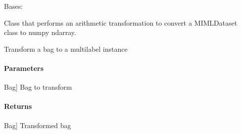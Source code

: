 \documentclass[letterpaper,10pt,english]{sphinxmanual}
\begin{document}
\begin{fulllineitems}
\label{\detokenize{transformation/mimlTOml/_autosummary/miml.transformation.mimlTOml.arithmetic.ArithmeticTransformation:miml.transformation.mimlTOml.arithmetic.ArithmeticTransformation}}
\pysigstartsignatures
{}
\pysigstopsignatures
\sphinxAtStartPar
Bases: {\hyperref[\detokenize{transformation/mimlTOml/_autosummary/miml.transformation.mimlTOml.miml_to_ml_transformation.MIMLtoMLTransformation:miml.transformation.mimlTOml.miml_to_ml_transformation.MIMLtoMLTransformation}]{}}

\sphinxAtStartPar
Class that performs an arithmetic transformation to convert a MIMLDataset class to numpy ndarray.

\begin{fulllineitems}
\label{\detokenize{transformation/mimlTOml/_autosummary/miml.transformation.mimlTOml.arithmetic.ArithmeticTransformation:miml.transformation.mimlTOml.arithmetic.ArithmeticTransformation.transform_bag}}
\pysigstartsignatures
{}
\pysigstopsignatures
\sphinxAtStartPar
Transform a bag to a multilabel instance


\paragraph{Parameters}
\label{\detokenize{transformation/mimlTOml/_autosummary/miml.transformation.mimlTOml.arithmetic.ArithmeticTransformation:parameters}}\begin{description}
\sphinxlineitem{bag}{[}Bag{]}
\sphinxAtStartPar
Bag to transform

\end{description}


\paragraph{Returns}
\label{\detokenize{transformation/mimlTOml/_autosummary/miml.transformation.mimlTOml.arithmetic.ArithmeticTransformation:returns}}\begin{description}
\sphinxlineitem{transformed\_bag}{[}Bag{]}
\sphinxAtStartPar
Transformed bag


\end{description}
\end{fulllineitems}
\end{fulllineitems}
\end{document}
